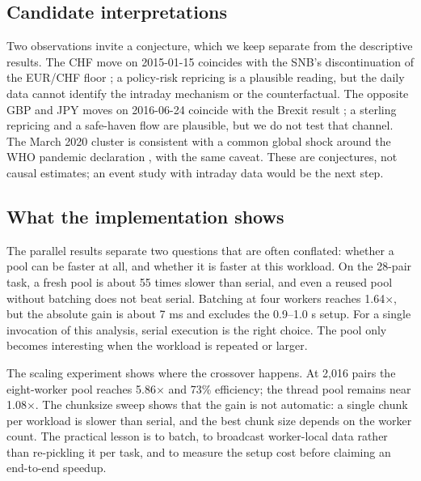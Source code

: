 \documentclass[journal]{IEEEtran}
\begin{document}
\subsection{Candidate interpretations}
Two observations invite a conjecture, which we keep separate from the descriptive results. The CHF move on 2015-01-15 coincides with the SNB's discontinuation of the EUR/CHF floor \cite{snb2015}; a policy-risk repricing is a plausible reading, but the daily data cannot identify the intraday mechanism or the counterfactual. The opposite GBP and JPY moves on 2016-06-24 coincide with the Brexit result \cite{ec2016}; a sterling repricing and a safe-haven flow are plausible, but we do not test that channel. The March 2020 cluster is consistent with a common global shock around the WHO pandemic declaration \cite{who2020}, with the same caveat. These are conjectures, not causal estimates; an event study with intraday data would be the next step.

\subsection{What the implementation shows}
The parallel results separate two questions that are often conflated: whether a pool can be faster at all, and whether it is faster at this workload. On the 28-pair task, a fresh pool is about 55 times slower than serial, and even a reused pool without batching does not beat serial. Batching at four workers reaches 1.64$\times$, but the absolute gain is about 7 ms and excludes the 0.9--1.0 s setup. For a single invocation of this analysis, serial execution is the right choice. The pool only becomes interesting when the workload is repeated or larger.

The scaling experiment shows where the crossover happens. At 2,016 pairs the eight-worker pool reaches 5.86$\times$ and 73\% efficiency; the thread pool remains near 1.08$\times$. The chunksize sweep shows that the gain is not automatic: a single chunk per workload is slower than serial, and the best chunk size depends on the worker count. The practical lesson is to batch, to broadcast worker-local data rather than re-pickling it per task, and to measure the setup cost before claiming an end-to-end speedup.
\end{document}
